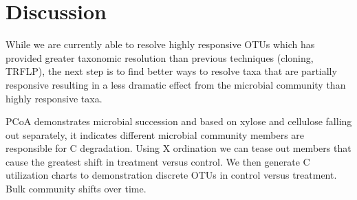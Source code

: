 \section{Discussion}

While we are currently able to resolve highly responsive OTUs which has provided greater taxonomic resolution than previous techniques (cloning, TRFLP), the next step is to find better ways to resolve taxa that are partially responsive resulting in a less dramatic effect from the microbial community than highly responsive taxa.  

PCoA demonstrates microbial succession and based on xylose and cellulose falling out separately, it indicates different microbial community members are responsible for C degradation.  Using X ordination we can tease out members that cause the greatest shift in treatment versus control.  We then generate C utilization charts to demonstration discrete OTUs in control versus treatment.  Bulk community shifts over time. 